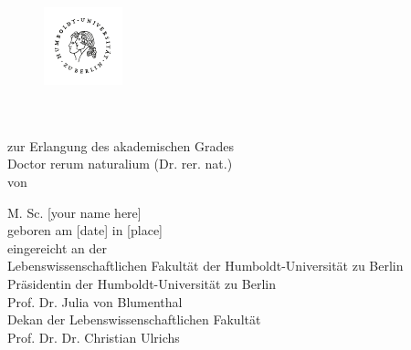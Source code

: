 \thispagestyle{empty} %



\begin{figure}[t]
    \centering
    \vspace{-1.1cm}
    \includegraphics[width=0.32\linewidth]{hu_siegel_schwarz.pdf}
    \vspace{0.23cm}
\end{figure}


\begin{center}

{\color{Maroon}\scshape\LARGE {}}\\

\vspace{1.2cm}
\\
zur Erlangung des akademischen Grades\\
Doctor rerum naturalium (Dr. rer. nat.)\\

\vspace{0.8cm}
von\\
\vspace{0.8cm}

{\Large M. Sc. [your name here]}\\
geboren am [date] in [place]\\


\vspace{0.9cm}
eingereicht an der\\
Lebenswissenschaftlichen Fakultät der Humboldt-Universität zu Berlin\\

\vspace{0.4cm}
Präsidentin der Humboldt-Universität zu Berlin\\
Prof. Dr. Julia von Blumenthal\\%
\vspace{0.2cm}
Dekan der Lebenswissenschaftlichen Fakultät\\%
Prof. Dr. Dr. Christian Ulrichs
\end{center}


